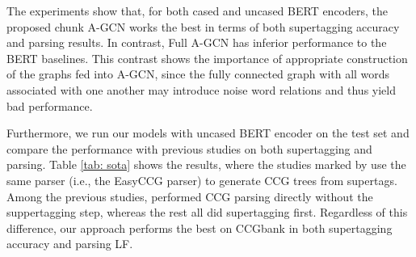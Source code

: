 \documentclass[11pt,a4paper]{article}
\begin{document}
The experiments show that, for both cased and uncased BERT encoders, the proposed chunk A-GCN works the best in terms of both supertagging accuracy and parsing results.
In contrast, Full A-GCN has inferior performance to the BERT baselines.
This contrast shows the importance of appropriate construction of the graphs fed into A-GCN,
since the fully connected graph with all words associated with one another may introduce noise 
word relations and thus yield bad performance.




Furthermore, we run our models with uncased BERT encoder on the test set and compare the 
performance
with previous studies on both supertagging and parsing.
Table \ref{tab: sota} shows the results, where the studies marked by  use the same parser (i.e., the EasyCCG parser) to generate CCG trees from supertags.
Among the previous studies, \citet{stanojevic-steedman-2019-ccg} performed CCG parsing directly without the suppertagging step, whereas the rest all did supertagging first.
Regardless of this difference, our approach performs the best on CCGbank in both supertagging accuracy and parsing LF.
\end{document}
